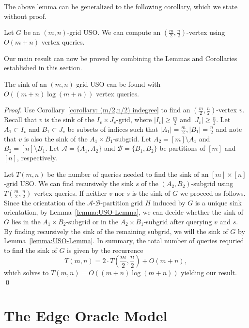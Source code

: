 \documentclass[runningheads,a4paper]{llncs}
\newcommand{\A}{\ensuremath{\mathcal A}}
\newcommand{\B}{\ensuremath{\mathcal B}}
\begin{document}
The above lemma can be generalized to the following corollary, which we state without proof. 
\begin{corollary}\label{corollary: (m/2,n/2) indegree}
Let $G$ be an $(m,n)$-grid USO. 
We can compute an $( \frac{m}{2}, \frac{n}{2})$-vertex using $O(m + n)$ vertex queries.
\end{corollary}

Our main result can now be proved by combining the Lemmas and Corollaries established in this section. 

\begin{theorem}\label{theorem:Sink algorithm}
The sink of an $(m,n)$-grid USO can be found with \\ $O((m+n)\log (m+n))$ vertex queries.
\end{theorem}

\begin{proof}
Use Corollary~\ref{corollary: (m/2,n/2) indegree} to find an $(\frac{m}{2}, \frac{n}{2})$-vertex $v$. 
Recall that $v$ is the sink of the $I_v\times J_v$-grid, where $|I_v| \geq \frac{m}{2}$ and $|J_v|\geq \frac{n}{2}$. Let $A_1\subset I_v$ and $B_1\subset J_v$ be subsets of indices such that $|A_1| = \frac{m}{2}, |B_1| = \frac{n}{2}$ and note that $v$ is also the sink of the $A_1\times B_1$-subgrid.
Let $A_2= [m]\setminus A_1$ and $B_2 = [n]\setminus B_1$.
Let $\A = \{A_1, A_2\}$ and $\B = \{B_1, B_2\}$ be partitions of $[m]$ and $[n]$, respectively.

Let $T(m, n)$ be the number of queries needed to find the sink of an $[m]\times[n]$-grid USO.
We can find recursively the sink $s$ of the $(A_2, B_2)$-subgrid using $T(\frac{m}{2}, \frac{n}{2})$ vertex queries. 
If neither $v$ nor $s$ is the sink of $G$ we proceed as follows.
Since the orientation of the $\A$-$\B$-partition grid $H$ induced by $G$ is a unique sink orientation, by Lemma~\ref{lemma:USO-Lemma}, we can decide whether the sink of $G$ lies in the $A_1\times B_2$-subgrid or in the $A_2\times B_1$-subgrid after querying $v$ and $s$.
By finding recursively the sink of the remaining subgrid, we will the sink of $G$ by Lemma~\ref{lemma:USO-Lemma}. In summary, the total number of queries requried to find the sink of $G$ is given by the recurrence
$$T(m, n) = 2\cdot T\left(\frac{m}{2}, \frac{n}{2}\right) + O(m+n),$$
which solves to $T(m, n) = O((m+n) \log (m+n))$ yielding our result. \qed
\end{proof}

\section{The Edge Oracle Model}
\label{section:The edge oracle model}
\end{document}
